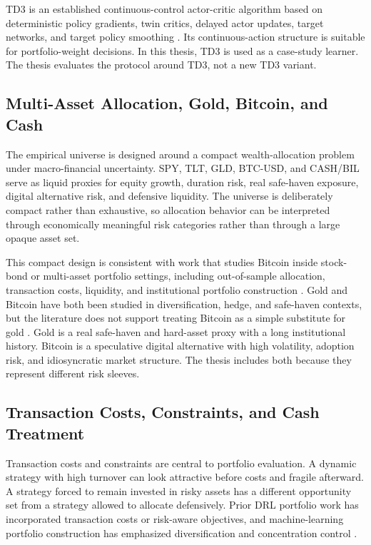 \documentclass[12pt]{article}
\begin{document}
TD3 is an established continuous-control actor-critic algorithm based on deterministic policy gradients, twin critics, delayed actor updates, target networks, and target policy smoothing \citep{silver2014,lillicrap2015,fujimoto2018}. Its continuous-action structure is suitable for portfolio-weight decisions. In this thesis, TD3 is used as a case-study learner. The thesis evaluates the protocol around TD3, not a new TD3 variant.

\subsection{Multi-Asset Allocation, Gold, Bitcoin, and Cash}

The empirical universe is designed around a compact wealth-allocation problem under macro-financial uncertainty. SPY, TLT, GLD, BTC-USD, and CASH/BIL serve as liquid proxies for equity growth, duration risk, real safe-haven exposure, digital alternative risk, and defensive liquidity. The universe is deliberately compact rather than exhaustive, so allocation behavior can be interpreted through economically meaningful risk categories rather than through a large opaque asset set.

This compact design is consistent with work that studies Bitcoin inside stock-bond or multi-asset portfolio settings, including out-of-sample allocation, transaction costs, liquidity, and institutional portfolio construction \citep{platanakis2020bitcoin,hubrich2023bitcoin,petukhina2021digitalassets}. Gold and Bitcoin have both been studied in diversification, hedge, and safe-haven contexts, but the literature does not support treating Bitcoin as a simple substitute for gold \citep{bouri2017bitcoinhedge,henriques2018bitcoinGold,guesmi2019bitcoinDiversification,klein2018bitcoin}. Gold is a real safe-haven and hard-asset proxy with a long institutional history. Bitcoin is a speculative digital alternative with high volatility, adoption risk, and idiosyncratic market structure. The thesis includes both because they represent different risk sleeves.

\subsection{Transaction Costs, Constraints, and Cash Treatment}

Transaction costs and constraints are central to portfolio evaluation. A dynamic strategy with high turnover can look attractive before costs and fragile afterward. A strategy forced to remain invested in risky assets has a different opportunity set from a strategy allowed to allocate defensively. Prior DRL portfolio work has incorporated transaction costs or risk-aware objectives, and machine-learning portfolio construction has emphasized diversification and concentration control \citep{moody2001,almahdi2017,chen2022,jiang2024td3}.
\end{document}
